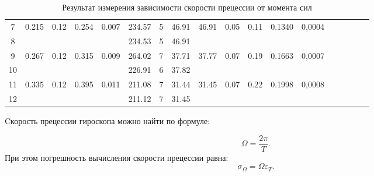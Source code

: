 \documentclass[12pt, a4paper]{article}
\begin{document}
\begin{table}[h!]
\begin{tabular}{|c|c|c|c|c|c|c|c|c|c|c|c|c|c|c|c|c|c|}
	7  & \multirow{2}{*}{0.215} & \multirow{2}{*}{0.12} & \multirow{2}{*}{0.254} & \multirow{2}{*}{0.007} & 234.57            & 5              & 46.91              & \multirow{2}{*}{46.91} & \multirow{2}{*}{0.05} & \multirow{2}{*}{0.11}  & \multirow{2}{*}{0.1340}                   & \multirow{2}{*}{0,0004} \\ \cline{1-1} \cline{6-8}
	8  &                        &                       &                        &                        & 234.53            & 5              & 46.91              &                        &                       &                        &                                           &                         \\ \hline \hline
	9  & \multirow{2}{*}{0.267} & \multirow{2}{*}{0.12} & \multirow{2}{*}{0.315} & \multirow{2}{*}{0.009} & 264.02            & 7              & 37.71              & \multirow{2}{*}{37.77} & \multirow{2}{*}{0.07} & \multirow{2}{*}{0.19}  & \multirow{2}{*}{0.1663}                   & \multirow{2}{*}{0,0007} \\ \cline{1-1} \cline{6-8}
	10 &                        &                       &                        &                        & 226.91            & 6              & 37.82              &                        &                       &                        &                                           &                         \\ \hline \hline
	11 & \multirow{2}{*}{0.335} & \multirow{2}{*}{0.12} & \multirow{2}{*}{0.395} & \multirow{2}{*}{0.011} & 211.08            & 7              & 31.44              & \multirow{2}{*}{31.45} & \multirow{2}{*}{0.07} & \multirow{2}{*}{0.22}  & \multirow{2}{*}{0.1998}                   & \multirow{2}{*}{0,0008} \\ \cline{1-1} \cline{6-8}
	12 &                        &                       &                        &                        & 211.12            & 7              & 31.45              &                        &                       &                        &                                           &                         \\ \hline
	\end{tabular}
	\caption{Результат измерения зависимости скорости прецессии от момента сил}
\end{table}

Cкорость прецессии гироскопа можно найти по формуле:

\begin{equation}
\Omega = \frac{2\pi}{T}.
\end{equation}
При этом погрешность вычисления скорости прецессии равна:
\begin{equation}
\sigma_\Omega = \Omega \varepsilon_T.
\end{equation}
\end{document}
